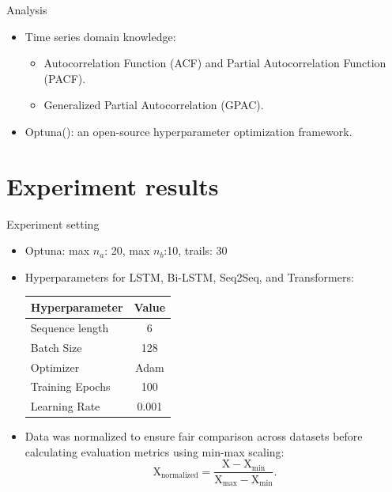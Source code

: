 \documentclass[aspectratio=16 9,10pt]{beamer}
\begin{document}
\begin{frame}{Analysis}
\begin{itemize}
     \item Time series domain knowledge:
        \begin{itemize}
         \item Autocorrelation Function (ACF) and Partial Autocorrelation Function (PACF).
         \item Generalized Partial Autocorrelation (GPAC).
         \end{itemize}
     \item Optuna(\cite{akiba2019optuna}): an open-source hyperparameter optimization framework.

\end{itemize}
\end{frame}

\section{Experiment results}

\begin{frame}{Experiment setting}
\begin{itemize}
\item Optuna: max \( n_a \): 20, max \( n_b \):10, trails: 30

\item Hyperparameters for LSTM, Bi-LSTM, Seq2Seq, and Transformers:
\begin{table}
\centering
\begin{tabular}{lc}
\hline
\textbf{Hyperparameter} & \hspace{3cm} \textbf{Value} \\ \hline
Sequence length         & \hspace{3cm} 6           \\ 
Batch Size              & \hspace{3cm} 128           \\ 
Optimizer               & \hspace{3cm} Adam          \\ 
Training Epochs         & \hspace{3cm} 100           \\ 
Learning Rate           & \hspace{3cm} 0.001         \\ \hline
\end{tabular}
\label{tab:hyperparams}
\end{table}

\item Data was normalized to ensure fair comparison across datasets before calculating evaluation metrics using min-max scaling:
\begin{equation}
\text{X}_{\text{normalized}} = \frac{\text{X} - \text{X}_{\min}}{\text{X}_{\max} - \text{X}_{\min}}.
\end{equation}
\end{itemize}
\end{frame}
\end{document}
